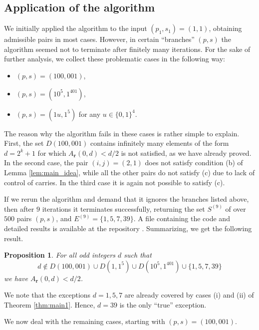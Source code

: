 \documentclass[a4paper,11pt]{amsart}
\newtheorem{prop}[thm]{Proposition}
\theoremstyle{definition}
\begin{document}
\subsection{Application of the algorithm}
We initially applied the algorithm to the input $(p_1,s_1) = (1,1)$, obtaining admissible pairs in most cases. However, in certain ``branches'' $(p,s)$ the algorithm seemed not to terminate after finitely many iterations. For the sake of further analysis, we collect these problematic cases in the following way:
\begin{itemize}
    \item $(p,s) = (100,001)$,
    \item $(p,s) = (10^5,1^401)$,
    \item $(p,s) = (1u,1^5)$ for any $u \in \{0,1\}^4$.    
\end{itemize}
The reason why the algorithm fails in these cases is rather simple to explain. First, the set $D(100,001)$ contains infinitely many elements of the form $d=2^k+1$ for which $A_{\mathbf{r}}(0,d) <d/2$ is not satisfied, as we have already proved. In the second case, the pair $(i,j) = (2,1)$ does not satisfy condition (b) of Lemma \ref{lem:main_idea}, while all the other pairs do not satisfy (c) due to lack of control of carries. In the third case it is again not possible to satisfy (c). 

If we rerun the algorithm and demand that it ignores the branches listed above, then after $9$ iterations it terminates successfully, returning the set $S^{(9)}$ of over $500$ pairs $(p,s)$, and $E^{(9)} =\{1,5,7,39\}$. A file containing the code and detailed results is available at the repository \cite{Git}.
Summarizing, we get the following result.

\begin{prop} \label{prop:application_1}
    For all odd integers $d$ such that
    $$d \not\in  D(100,001) \cup D(1,1^5) \cup D(10^5,1^401) \cup \{1,5,7,39\} $$
    we have $A_{\mathbf{r}}(0,d) < d/2$.
\end{prop}

We note that the exceptions $d=1,5,7$ are already covered by cases (i) and (ii) of Theorem \ref{thm:main1}. Hence, $d=39$ is the only ``true'' exception.

We now deal with the remaining cases, starting with $(p,s) = (100,001)$.
\end{document}
